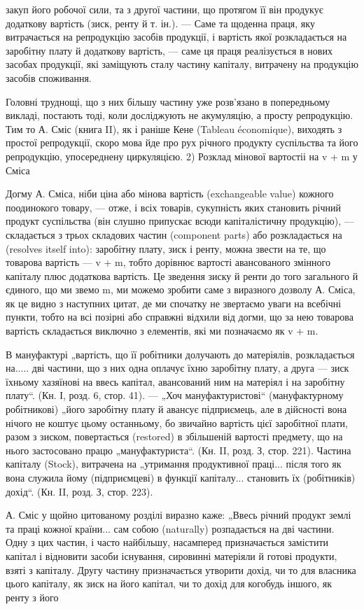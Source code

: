 \parcont{}  %
закуп його робочої сили, та з другої частини, що протягом її він продукує
додаткову вартість (зиск, ренту й т. ін.). — Саме та щоденна праця,
яку витрачається на репродукцію засобів продукції, і вартість якої
розкладається на заробітну плату й додаткову вартість, — саме ця праця
реалізується в нових засобах продукції, які заміщують сталу частину
капіталу, витрачену на продукцію засобів споживання.

Головні труднощі, що з них більшу частину уже розв’язано в попередньому
викладі, постають тоді, коли досліджують не акумуляцію, а просту
репродукцію. Тим то А. Сміс (книга II), як і раніше Кене (Tableau
économique), виходять з простої репродукції, скоро мова йде про рух
річного продукту суспільства та його репродукцію, упосереднену циркуляцією.
2) Розклад мінової вартостіі на v + m у Сміса

Догму А. Сміса, ніби ціна або мінова вартість (exchangeable value)
кожного поодинокого товару, — отже, і всіх товарів, сукупність яких
становить річний продукт суспільства (він слушно припускає всюди капіталістичну
продукцію), — складається з трьох складових частин (component
parts) або розкладається на (resolves itself into): заробітну плату,
зиск і ренту, можна звести на те, що товарова вартість — v + m, тобто
дорівнює вартості авансованого змінного капіталу плюс додаткова вартість.
Це зведення зиску й ренти до того загального й єдиного, що
ми звемо m, ми можемо зробити саме з виразного дозволу А. Сміса, як
це видно з наступних цитат, де ми спочатку не звертаємо уваги на всебічні
пункти, тобто на всі позірні або справжні відхили від догми, що за
нею товарова вартість складається виключно з елементів, які ми позначаємо
як v + m.

В мануфактурі „вартість, що її робітники долучають до матеріялів,
розкладається на..... дві частини, що з них одна оплачує їхню заробітну
плату, а друга — зиск їхньому хазяїнові на ввесь капітал, авансований ним
на матеріял і на заробітну плату“. (Кн. І, розд. 6, стор. 41). — „Хоч
мануфактуристові“ (мануфактурному робітникові) „його заробітну плату
й авансує підприємець, але в дійсності вона нічого не коштує цьому
останньому, бо звичайно вартість цієї заробітної плати, разом з зиском,
повертається (restored) в збільшеній вартості предмету, що на нього застосовано
працю „мануфактуриста“. (Кн. II, розд. З, стор. 221). Частина капіталу
(Stock), витрачена на „утримання продуктивної праці... після того як вона
служила йому (підприємцеві) в функції капіталу... становить їх (робітників)
дохід“. (Кн. II, розд. З, стор. 223).

А. Сміс у щойно цитованому розділі виразно каже: „Ввесь річний
продукт землі та праці кожної країни... сам собою (naturally) розпадається
на дві частини. Одну з цих частин, і часто найбільшу, насамперед
призначається замістити капітал і відновити засоби існування, сировинні
матеріяли й готові продукти, взяті з капіталу. Другу частину призначається
утворити дохід, чи то для власника цього капіталу, як зиск на
його капітал, чи то дохід для когобудь іншого, як ренту з його
\parbreak{}  %
